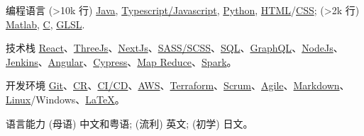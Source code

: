 
\begin{cvskills}
\cvskill
{编程语言}
{(>10k 行) \href{https://www.java.com/en/}{Java}, \href{https://www.javascript.com/}{Typescript/Javascript}, \href{https://www.python.org/}{Python}, \href{https://developer.mozilla.org/en-US/docs/Glossary/HTML5}{HTML}/\href{https://developer.mozilla.org/en-US/docs/Web/CSS}{CSS}; (>2k 行) \href{https://uk.mathworks.com/products/matlab.html}{Matlab}, \href{https://en.wikipedia.org/wiki/C_(programming_language)}{C}, \href{https://www.khronos.org/opengl/wiki/OpenGL_Shading_Language}{GLSL}.}

\cvskill
{技术栈}
{\href{https://reactjs.org/}{React}、\href{https://threejs.org/}{ThreeJs}、\href{https://nextjs.org/}{NextJs}、\href{https://sass-lang.com/}{SASS/SCSS}、\href{https://en.wikipedia.org/wiki/SQL}{SQL}、\href{https://graphql.org/}{GraphQL}、\href{https://nodejs.org/en/}{NodeJs}、\href{https://www.jenkins.io/}{Jenkins}、\href{https://angular.io/}{Angular}、\href{https://www.cypress.io/}{Cypress}、\href{https://en.wikipedia.org/wiki/MapReduce}{Map Reduce}、\href{https://spark.apache.org/}{Spark}。}

\cvskill
{开发环境}
{\href{https://git-scm.com/}{Git}、\href{https://en.wikipedia.org/wiki/Code_review}{CR}、\href{https://www.redhat.com/en/topics/devops/what-is-ci-cd}{CI/CD}、\href{https://aws.amazon.com/}{AWS}、\href{https://www.terraform.io/}{Terraform}、\href{https://www.scrum.org/resources/what-is-scrum}{Scrum}、\href{https://www.atlassian.com/agile}{Agile}、\href{https://en.wikipedia.org/wiki/Markdown}{Markdown}、\href{https://en.wikipedia.org/wiki/Unix}{Linux}/Windows、\href{https://www.latex-project.org/}{LaTeX}。}

\cvskill
{语言能力}
{(母语) 中文和粤语; (流利) 英文; (初学) 日文。}

\end{cvskills}